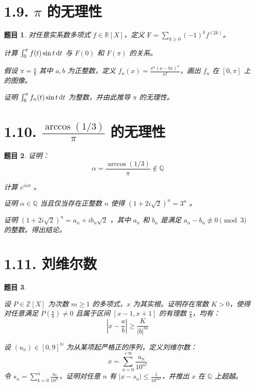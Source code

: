 \documentclass[12pt,UTF8]{ctexbook}
\theoremstyle{exercisestyle}
\newtheorem*{exercise}{题目}
\theoremstyle{solutionstyle}
\begin{document}
\section{1.9. $\pi$ 的无理性}
\begin{exercise}
  对任意实系数多项式 $f \in \mathbb{R}[X]$，定义 $\mathrm{F} = \sum\limits_{k \geqslant 0} (-1)^k f^{(2k)}$。
  \begin{subquestions}
    \item 计算 $\int_0^{\pi} f(t) \sin t \,\mathrm{d}t$ 与 $F(0)$ 和 $F(\pi)$ 的关系。
    \item 假设 $\pi = \frac{a}{b}$ 其中 $a, b$ 为正整数，定义 $f_n(x) = \frac{x^n (a - bx)^n}{n!}$，画出 $f_n$ 在 $[0, \pi]$ 上的图像。
    \item 证明 $\int_0^{\pi} f_n(t) \sin t \,\mathrm{d}t$ 为整数，并由此推导 $\pi$ 的无理性。
  \end{subquestions}
\end{exercise}

\section{1.10. $\frac{\arccos (1/3)}{\pi}$ 的无理性}
\begin{exercise}
证明：
$$
\alpha = \frac{\arccos (1/3)}{\pi} \notin \mathbb{Q}
$$
\begin{subquestions}
\item 计算 $e^{i\alpha\pi}$ 。
\item 证明 $\alpha \in \mathbb{Q}$ 当且仅当存在正整数 $n$ 使得 $(1 + 2i\sqrt{2})^n = 3^n$ 。
\item 证明 $(1+2i\sqrt{2})^n = a_n + ib_n\sqrt{2}$ ，其中 $a_n$ 和 $b_n$ 是满足 $a_n - b_n \not\equiv 0 \pmod{3}$ 的整数。得出结论。
\end{subquestions}
\end{exercise}

\section{1.11. 刘维尔数}
\begin{exercise}
\begin{subquestions}
\item 设 $P \in \mathbb{Z}[X]$ 为次数 $m \geq 1$ 的多项式，$x$ 为其实根。证明存在常数 $K > 0$，使得对任意满足 $\displaystyle P(\frac{a}{b}) \neq 0$ 且属于区间 $[x-1,x+1]$ 的有理数 $\displaystyle\frac{a}{b}$，均有：
$$
\left|x-\frac{a}{b}\right| \geqslant \frac{K}{|b|^m}
$$
\item 设 $(u_n) \in [0, 9]^{\mathbb{N}}$ 为从某项起严格正的序列，定义刘维尔数：
$$
x = \sum_{n=0}^{+\infty} \frac{u_n}{10^{n!}}
$$
令 $\displaystyle s_n = \sum_{k=0}^n \frac{u_k}{10^{k!}}$，证明对任意 $n$ 有 $\displaystyle|x - s_n| \leq \frac{1}{10^{nn!}}$，并推出 $x$ 在 $\mathbb{Q}$ 上超越。
\end{subquestions}
\end{exercise}
\end{document}
